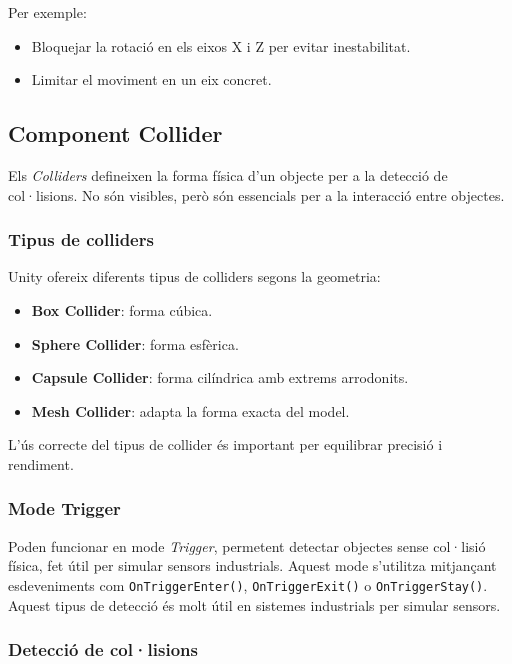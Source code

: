 \documentclass[12pt,a4paper]{report}
\begin{document}
Per exemple:

\begin{itemize}
\item Bloquejar la rotació en els eixos X i Z per evitar inestabilitat.
\item Limitar el moviment en un eix concret.
\end{itemize}


\subsection{Component Collider}

Els \textit{Colliders} \cite{UnityColliders} defineixen la forma física d'un objecte per a la detecció de col·lisions. No són visibles, però són essencials per a la interacció entre objectes.

\subsubsection{Tipus de colliders}

Unity ofereix diferents tipus de colliders segons la geometria:

\begin{itemize}
\item \textbf{Box Collider}: forma cúbica.
\item \textbf{Sphere Collider}: forma esfèrica.
\item \textbf{Capsule Collider}: forma cilíndrica amb extrems arrodonits.
\item \textbf{Mesh Collider}: adapta la forma exacta del model.
\end{itemize}

L'ús correcte del tipus de collider és important per equilibrar precisió i rendiment.

\subsubsection{Mode Trigger}

Poden funcionar en mode \textit{Trigger}, permetent detectar objectes sense col·lisió física, fet útil per simular sensors industrials. Aquest mode s'utilitza mitjançant esdeveniments com \texttt{OnTriggerEnter()}, \texttt{OnTriggerExit()} o \texttt{OnTriggerStay()}. Aquest tipus de detecció és molt útil en sistemes industrials per simular sensors.

\subsubsection{Detecció de col·lisions}
\end{document}
